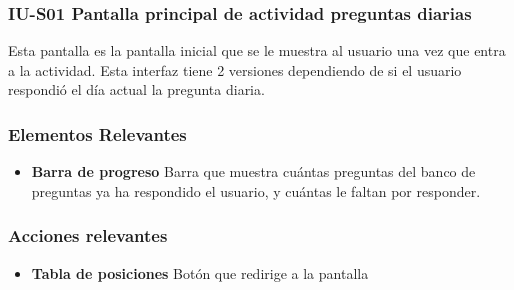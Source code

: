 
\subsubsection{IU-S01 Pantalla principal de actividad preguntas diarias}

 Esta pantalla es la pantalla inicial que se le muestra al usuario una vez que entra a la actividad.
 Esta interfaz tiene 2 versiones dependiendo de si el usuario respondió el día actual la pregunta diaria.



\subsubsection{Elementos Relevantes}

    \begin{itemize}
    \item {\bf Barra de progreso}
        Barra que muestra cuántas preguntas del banco de preguntas ya ha respondido el usuario, y cuántas le faltan por responder.
    \end{itemize}

\subsubsection{Acciones relevantes}

    \begin{itemize}
    \item {\bf Tabla de posiciones}
        Botón que redirige a la pantalla 
    \end{itemize}

\clearpage
